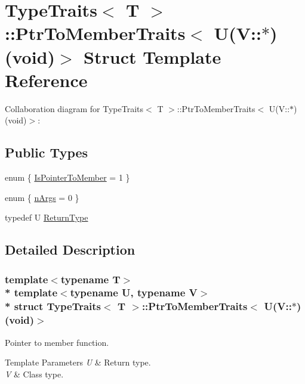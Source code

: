 \hypertarget{structTypeTraits_1_1PtrToMemberTraits_3_01U_07V_1_1_5_08_07void_08_4}{}\section{Type\+Traits$<$ T $>$\+:\+:Ptr\+To\+Member\+Traits$<$ U(V\+:\+:$\ast$)(void)$>$ Struct Template Reference}
\label{structTypeTraits_1_1PtrToMemberTraits_3_01U_07V_1_1_5_08_07void_08_4}


Collaboration diagram for Type\+Traits$<$ T $>$\+:\+:Ptr\+To\+Member\+Traits$<$ U(V\+:\+:$\ast$)(void)$>$\+:
\subsection*{Public Types}
\begin{DoxyCompactItemize}
\item 
enum \{ \hyperlink{structTypeTraits_1_1PtrToMemberTraits_3_01U_07V_1_1_5_08_07void_08_4_a484ebbde0a8818f1553ee0bc7c5224f3aa4051e64d12bc01c66d7d76cfe9606d4}{Is\+Pointer\+To\+Member} = 1
 \}
\item 
enum \{ \hyperlink{structTypeTraits_1_1PtrToMemberTraits_3_01U_07V_1_1_5_08_07void_08_4_ac296e9a2a1296bf3bcc3798bf1d2885da83a7cfdf95df854379aa63b538c24ac8}{n\+Args} = 0
 \}
\item 
typedef U \hyperlink{structTypeTraits_1_1PtrToMemberTraits_3_01U_07V_1_1_5_08_07void_08_4_a1b7ee84f9134e7802a6c17a684e5d094}{Return\+Type}
\end{DoxyCompactItemize}


\subsection{Detailed Description}
\subsubsection*{template$<$typename T$>$\\*
template$<$typename U, typename V$>$\\*
struct Type\+Traits$<$ T $>$\+::\+Ptr\+To\+Member\+Traits$<$ U(\+V\+::$\ast$)(void)$>$}

Pointer to member function. 
\begin{DoxyTemplParams}{Template Parameters}
{\em U} & Return type. \\
\hline
{\em V} & Class type. \\
\hline
\end{DoxyTemplParams}


